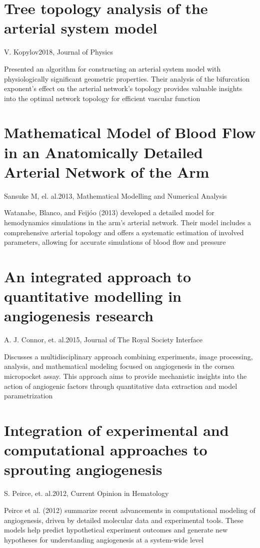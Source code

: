 \section{Tree topology analysis of the arterial system model}{V. Kopylov}{2018, Journal of Physics}

Presented an algorithm for constructing an arterial system model with physiologically significant geometric properties. Their analysis of the bifurcation exponent's effect on the arterial network's topology provides valuable insights into the optimal network topology for efficient vascular function  \cite{Kopylova2018}

\section{Mathematical Model of Blood Flow in an Anatomically Detailed Arterial Network of the Arm}{Sansuke M, el. al.}{2013, Mathematical Modelling and Numerical Analysis}

Watanabe, Blanco, and Feijóo (2013) developed a detailed model for hemodynamics simulations in the arm's arterial network. Their model includes a comprehensive arterial topology and offers a systematic estimation of involved parameters, allowing for accurate simulations of blood flow and pressure \cite{Watanabe2013}


\section{An integrated approach to quantitative modelling in angiogenesis research}{A. J. Connor, et. al.}{2015, Journal of The Royal Society Interface}

Discusses a multidisciplinary approach combining experiments, image processing, analysis, and mathematical modeling focused on angiogenesis in the cornea micropocket assay. This approach aims to provide mechanistic insights into the action of angiogenic factors through quantitative data extraction and model parametrization \cite{Connor2015}


\section{Integration of experimental and computational approaches to sprouting angiogenesis}{S. Peirce, et. al.}{2012, Current Opinion in Hematology}

Peirce et al. (2012) summarize recent advancements in computational modeling of angiogenesis, driven by detailed molecular data and experimental tools. These models help predict hypothetical experiment outcomes and generate new hypotheses for understanding angiogenesis at a system-wide level \cite{Peirce2012}

